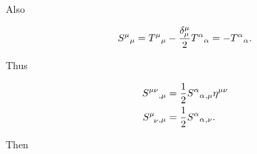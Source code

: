 \documentclass[
  letterpaper,
  DIV=11,
  numbers=noendperiod,
  oneside]{scrreprt}
\begin{document}
Also

\[
    \texttip{\texttip{S}{source tensor}^{\mu}{}_{\mu}}{source tensor trace} = \texttip{\texttip{T}{Stress-Energy tensor, or energy-momentum tensor}^{\mu}{}_{\mu}}{Stress-Energy tensor trace} -\frac{\texttip{\delta_\mu^\mu}{Kronecker delta}}{2}\texttip{\texttip{T}{Stress-Energy tensor, or energy-momentum tensor}^{\alpha}{}_{\alpha}}{Stress-Energy tensor trace}= -\texttip{\texttip{T}{Stress-Energy tensor, or energy-momentum tensor}^{\alpha}{}_{\alpha}}{Stress-Energy tensor trace}.
\]

Thus

\[
\begin{split}
    \texttip{\texttip{S}{source tensor}^{\mu\nu}}{contravariant source tensor component}\texttip{{}_{,\mu}}{Partial derivative} &= \frac{1}{2}\texttip{\texttip{S}{source tensor}^{\alpha}{}_{\alpha}}{source tensor trace}\texttip{{}_{,\mu}}{Partial derivative}\texttip{\texttip{\eta}{Minkoski metric tensor +---}^{\mu\nu}}{contravariant Minkoski metric components +---} \\
    \texttip{\texttip{S}{source tensor}^{\mu}_{\phantom{\mu}\nu}}{mixed source tensor component}\texttip{{}_{,\mu}}{Partial derivative} &= \frac{1}{2}\texttip{\texttip{S}{source tensor}^{\alpha}{}_{\alpha}}{source tensor trace}\texttip{{}_{,\nu}}{Partial derivative}.
\end{split}
\]

Then
\end{document}
